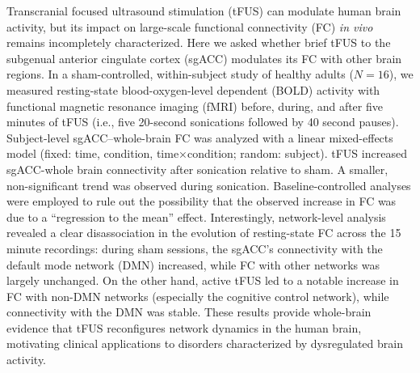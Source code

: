 
\noindent Transcranial focused ultrasound stimulation (tFUS) can modulate human brain activity, but its impact on large-scale functional connectivity (FC) \emph{in vivo} remains incompletely characterized. Here we asked whether brief tFUS to the subgenual anterior cingulate cortex (sgACC) modulates its FC with other brain regions. In a sham-controlled, within-subject study of healthy adults ($N=16$), we measured resting-state blood-oxygen-level dependent (BOLD) activity with functional magnetic resonance imaging (fMRI) before, during, and after five minutes of tFUS (i.e., five 20-second sonications followed by 40 second pauses). Subject-level sgACC–whole-brain FC was analyzed with a linear mixed-effects model (fixed: time, condition, time×condition; random: subject). tFUS increased sgACC-whole brain connectivity after sonication relative to sham. A smaller, non-significant trend was observed during sonication. Baseline-controlled analyses were employed to rule out the possibility that the observed increase in FC was due to a ``regression to the mean'' effect. Interestingly, network-level analysis revealed a clear disassociation in the evolution of resting-state FC across the 15 minute recordings: during sham sessions, the sgACC's connectivity with the default mode network (DMN) increased, while FC with other networks was largely unchanged. On the other hand, active tFUS led to a notable increase in FC with non-DMN networks (especially the cognitive control network), while connectivity with the DMN was stable. These results provide whole-brain evidence that tFUS reconfigures network dynamics in the human brain, motivating clinical applications to disorders characterized by dysregulated brain activity.

